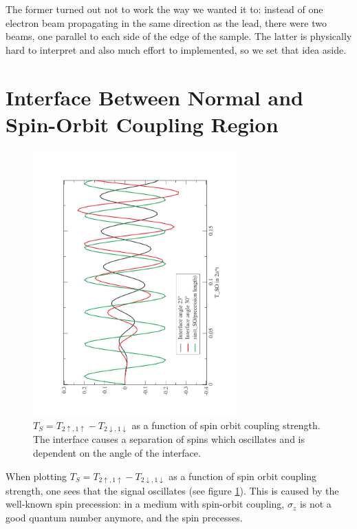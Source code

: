 The former turned out not to work the way we wanted it to: instead of one
electron beam propagating in the same direction as the lead, there were two
beams, one parallel to each side of the edge of the sample. The latter is
physically hard to interpret and also much effort to implemented, so we set
that idea aside.

\section{Interface Between Normal and Spin-Orbit Coupling Region}

\begin{figure}[htb]
    \begin{center}
    \includegraphics[angle=270,width=0.7\textwidth]{interface-precession.pdf}
    \end{center}
    \caption{$T_S = T_{2\uparrow,1\uparrow}-T_{2\downarrow,1\downarrow}$ as a
        function of spin orbit coupling strength. The interface causes a
        separation of spins which oscillates and is dependent on the angle of
        the interface.}
    \label{fig:interface-precession}
\end{figure}

When plotting $T_S = T_{2\uparrow,1\uparrow}-T_{2\downarrow,1\downarrow}$ as a
function of spin orbit coupling strength, one sees that the signal oscillates
(see figure \ref{fig:interface-precession}).
This is caused by the well-known %
spin precession: in a medium with spin-orbit coupling, $\sigma_z$ is not a good
quantum number anymore, and the spin precesses. %

